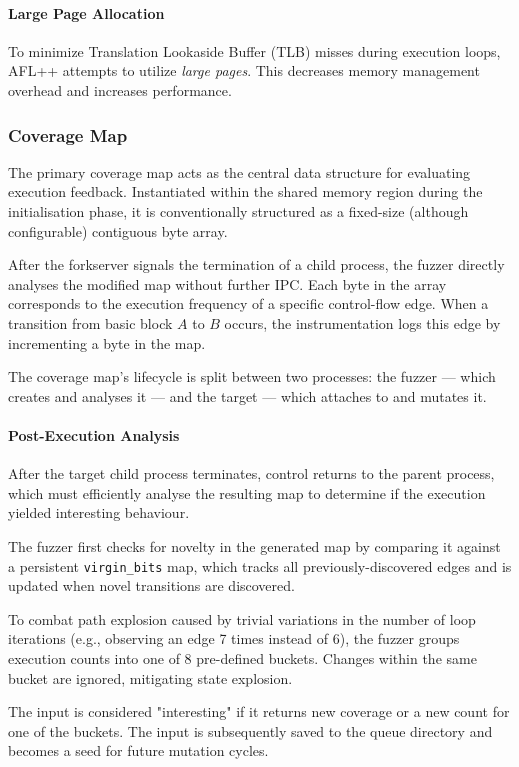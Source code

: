 \paragraph{Large Page Allocation} To minimize Translation Lookaside Buffer (TLB) misses during execution loops, AFL++ attempts to utilize \textit{large pages}. This decreases memory management overhead and increases performance.

\subsubsection{Coverage Map}

The primary coverage map acts as the central data structure for evaluating execution feedback. Instantiated within the shared memory region during the initialisation phase, it is conventionally structured as a fixed-size (although configurable) contiguous byte array.

After the forkserver signals the termination of a child process, the fuzzer directly analyses the modified map without further IPC. Each byte in the array corresponds to the execution frequency of a specific control-flow edge. When a transition from basic block $A$ to $B$ occurs, the instrumentation logs this edge by incrementing a byte in the map.

The coverage map's lifecycle is split between two processes: the fuzzer --- which creates and analyses it --- and the target --- which attaches to and mutates it.

\paragraph{Post-Execution Analysis} After the target child process terminates, control returns to the parent process, which must efficiently analyse the resulting map to determine if the execution yielded interesting behaviour. 

The fuzzer first checks for novelty in the generated map by comparing it against a persistent \texttt{virgin\_bits} map, which tracks all previously-discovered edges and is updated when novel transitions are discovered.  

To combat path explosion caused by trivial variations in the number of loop iterations (e.g., observing an edge 7 times instead of 6), the fuzzer groups execution counts into one of 8 pre-defined buckets. Changes within the same bucket are ignored, mitigating state explosion.

The input is considered "interesting" if it returns new coverage or a new count for one of the buckets. The input is subsequently saved to the queue directory and becomes a seed for future mutation cycles.


